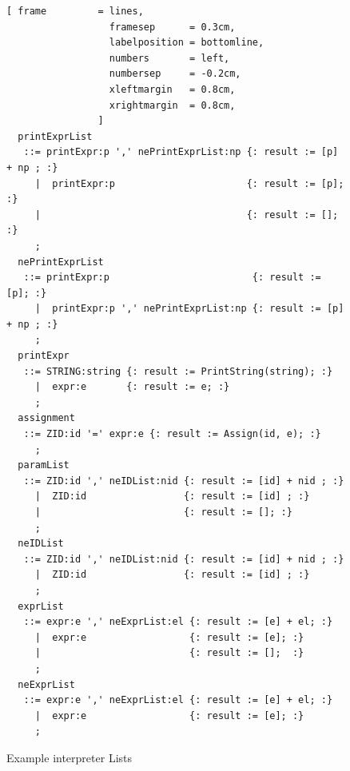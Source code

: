 \begin{figure}[!ht]

\begin{Verbatim}[ frame         = lines, 
                  framesep      = 0.3cm, 
                  labelposition = bottomline,
                  numbers       = left,
                  numbersep     = -0.2cm,
                  xleftmargin   = 0.8cm,
                  xrightmargin  = 0.8cm,
                ]
  printExprList 
   ::= printExpr:p ',' nePrintExprList:np {: result := [p] + np ; :}
     |  printExpr:p                       {: result := [p]; :}
     |                                    {: result := [];  :}
     ;
  nePrintExprList
   ::= printExpr:p                         {: result := [p]; :}
     |  printExpr:p ',' nePrintExprList:np {: result := [p] + np ; :}
     ;
  printExpr 
   ::= STRING:string {: result := PrintString(string); :}
     |  expr:e       {: result := e; :}
     ;
  assignment 
   ::= ZID:id '=' expr:e {: result := Assign(id, e); :}
     ;
  paramList 
   ::= ZID:id ',' neIDList:nid {: result := [id] + nid ; :}
     |  ZID:id                 {: result := [id] ; :}
     |                         {: result := []; :}
     ;
  neIDList
   ::= ZID:id ',' neIDList:nid {: result := [id] + nid ; :}
     |  ZID:id                 {: result := [id] ; :}
     ;
  exprList
   ::= expr:e ',' neExprList:el {: result := [e] + el; :}
     |  expr:e                  {: result := [e]; :}
     |                          {: result := [];  :}
     ;
  neExprList
   ::= expr:e ',' neExprList:el {: result := [e] + el; :}
     |  expr:e                  {: result := [e]; :}
     ;
		\end{Verbatim}
\caption{Example interpreter Lists}
\label{fig:example_interpreter_grammar_lists}
\end{figure}
